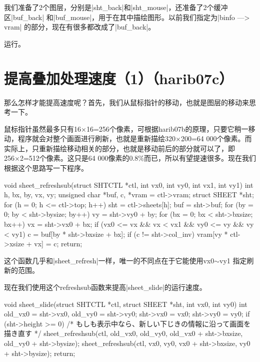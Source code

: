 我们准备了2个图层，分别是|sht_back|和|sht_mouse|，还准备了2个缓冲区|buf_back| 和|buf_mouse|，用于在其中描绘图形。以前我们指定为|binfo —> vram| 的部分，现在有很多都改成了|buf_back|。

运行。

\section{	提高叠加处理速度（1）（harib07c）	}
那么怎样才能提高速度呢？首先，我们从鼠标指针的移动，也就是图层的移动来思考一下。

鼠标指针虽然最多只有16×16=256个像素，可根据harib07b的原理，只要它稍一移动，程序就会对整个画面进行刷新，也就是重新描绘320×200=64 000个像素。而实际上，只重新描绘移动相关的部分，也就是移动前后的部分就可以了，即256×2=512个像素。这只是64 000像素的0.8\%而已，所以有望提速很多。现在我们根据这个思路写一下程序。

\cs

\begin{code}
void sheet_refreshsub(struct SHTCTL *ctl, int vx0, int vy0, int vx1, int vy1)
{
    int h, bx, by, vx, vy;
    unsigned char *buf, c, *vram = ctl->vram;
    struct SHEET *sht;
    for (h = 0; h <= ctl->top; h++) {
        sht = ctl->sheets[h];
        buf = sht->buf;
        for (by = 0; by < sht->bysize; by++) {
            vy = sht->vy0 + by;
            for (bx = 0; bx < sht->bxsize; bx++) {
                vx = sht->vx0 + bx;
                if (vx0 <= vx && vx < vx1 && vy0 <= vy && vy < vy1) {
                    c = buf[by * sht->bxsize + bx];
                    if (c != sht->col_inv) {
                        vram[vy * ctl->xsize + vx] = c;
                    }
                }
            }
        }
    }
    return;
}
\end{code}

这个函数几乎和|sheet_refresh|一样，唯一的不同点在于它能使用vx0$\sim$vy1 指定刷新的范围。

\cs

现在我们使用这个refreshsub函数来提高|sheet_slide|的运行速度。

\begin{code}
void sheet_slide(struct SHTCTL *ctl, struct SHEET *sht, int vx0, int vy0)
{
	int old_vx0 = sht->vx0, old_vy0 = sht->vy0;
	sht->vx0 = vx0;
	sht->vy0 = vy0;
	if (sht->height >= 0) { /* もしも表示中なら、新しい下じきの情報に沿って画面を描き直す */
		sheet_refreshsub(ctl, old_vx0, old_vy0, old_vx0 + sht->bxsize, old_vy0 + sht->bysize);
		sheet_refreshsub(ctl, vx0, vy0, vx0 + sht->bxsize, vy0 + sht->bysize);
	}
	return;
}
\end{code}

